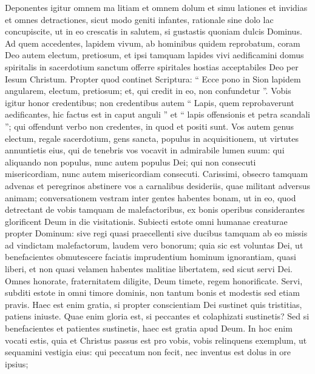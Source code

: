 \begin{biblechapter}
\begin{biblechapter}
\verse Deponentes igitur omnem ma litiam et omnem dolum et simu lationes et invidias et omnes detractiones, 
\verse sicut modo geniti infantes, rationale sine dolo lac concupiscite, ut in eo crescatis in salutem, 
\verse si gustastis quoniam dulcis Dominus. 
\verse Ad quem accedentes, lapidem vivum, ab hominibus quidem reprobatum, coram Deo autem electum, pretiosum, 
\verse et ipsi tamquam lapides vivi aedificamini domus spiritalis in sacerdotium sanctum offerre spiritales hostias acceptabiles Deo per Iesum Christum. 
\verse Propter quod continet Scriptura:
 “ Ecce pono in Sion lapidem angularem, electum, pretiosum;
 et, qui credit in eo, non confundetur ”.
 \verse Vobis igitur honor credentibus; non credentibus autem
 “ Lapis, quem reprobaverunt aedificantes, hic factus est in caput anguli ”
 \verse et “ lapis offensionis et petra scandali ”; qui offendunt verbo non credentes, in quod et positi sunt.
 \verse Vos autem genus electum, regale sacerdotium, gens sancta, populus in acquisitionem, ut virtutes annuntietis eius, qui de tenebris vos vocavit in admirabile lumen suum: 
\verse qui aliquando non populus, nunc autem populus Dei; qui non consecuti misericordiam, nunc autem misericordiam consecuti.
 \verse Carissimi, obsecro tamquam advenas et peregrinos abstinere vos a carnalibus desideriis, quae militant adversus animam; 
\verse conversationem vestram inter gentes habentes bonam, ut in eo, quod detrectant de vobis tamquam de malefactoribus, ex bonis operibus considerantes glorificent Deum in die visitationis.
 \verse Subiecti estote omni humanae creaturae propter Dominum: sive regi quasi praecellenti 
\verse sive ducibus tamquam ab eo missis ad vindictam malefactorum, laudem vero bonorum; 
\verse quia sic est voluntas Dei, ut benefacientes obmutescere faciatis imprudentium hominum ignorantiam, 
\verse quasi liberi, et non quasi velamen habentes malitiae libertatem, sed sicut servi Dei.
 \verse Omnes honorate, fraternitatem diligite, Deum timete, regem honorificate.
 \verse Servi, subditi estote in omni timore dominis, non tantum bonis et modestis sed etiam pravis. 
\verse Haec est enim gratia, si propter conscientiam Dei sustinet quis tristitias, patiens iniuste. 
\verse Quae enim gloria est, si peccantes et colaphizati sustinetis? Sed si benefacientes et patientes sustinetis, haec est gratia apud Deum. 
\verse In hoc enim vocati estis, quia
 et Christus passus est pro vobis,
 vobis relinquens exemplum,
 ut sequamini vestigia eius:
 \verse qui peccatum non fecit,
 nec inventus est dolus in ore ipsius;

\end{biblechapter}
\end{biblechapter}
